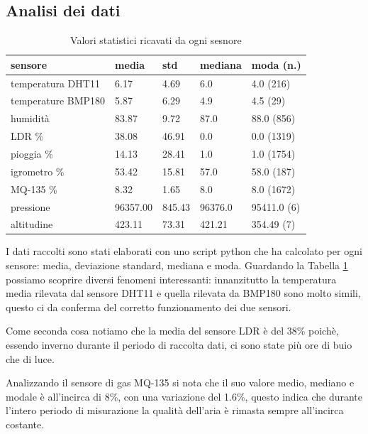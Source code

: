 \documentclass[a4paper, 12pt]{report}
\begin{document}
\subsection*{Analisi dei dati}
\vspace{0.5cm}

\begin{table}
  \centering
\begin{tabular}{ l l l l l }
  sensore & media & std & mediana & moda (n.) \\
  \hline
  temperatura DHT11 & 6.17 & 4.69 & 6.0 & 4.0 (216) \\
  \hline
  temperature BMP180 & 5.87 & 6.29 & 4.9 & 4.5 (29) \\
  \hline
  humidità & 83.87 & 9.72 & 87.0 & 88.0 (856) \\
  \hline
  LDR \% & 38.08 & 46.91 & 0.0 & 0.0 (1319) \\
  \hline
  pioggia \% & 14.13 & 28.41 & 1.0 & 1.0 (1754) \\
  \hline
  igrometro \% & 53.42 & 15.81 & 57.0 & 58.0 (187) \\
  \hline
  MQ-135 \% & 8.32 & 1.65 & 8.0 & 8.0 (1672) \\
  \hline
  pressione & 96357.00 & 845.43 & 96376.0 & 95411.0 (6) \\
  \hline
  altitudine & 423.11 & 73.31 & 421.21 & 354.49 (7) \\
  \hline
\end{tabular}
\caption{ Valori statistici ricavati da ogni sesnore }
\label{tab:all_data_stats}
\end{table}

I dati raccolti sono stati elaborati con uno script python che ha calcolato per ogni sensore: media, deviazione standard, mediana e moda.
Guardando la Tabella \ref{tab:all_data_stats} possiamo scoprire diversi fenomeni interessanti: innanzitutto la temperatura media rilevata dal sensore DHT11 e quella rilevata da BMP180 sono molto simili, 
questo ci da conferma del corretto funzionamento dei due sensori.

Come seconda cosa notiamo che la media del sensore LDR è del 38\% poichè, essendo inverno durante il periodo di raccolta dati, ci sono state 
più ore di buio che di luce.

Analizzando il sensore di gas MQ-135 si nota che il suo valore medio, mediano e modale è all'incirca di 8\%, con una variazione del 1.6\%, questo indica che durante l'intero periodo di misurazione 
la qualità dell'aria è rimasta sempre all'incirca costante.
\end{document}
